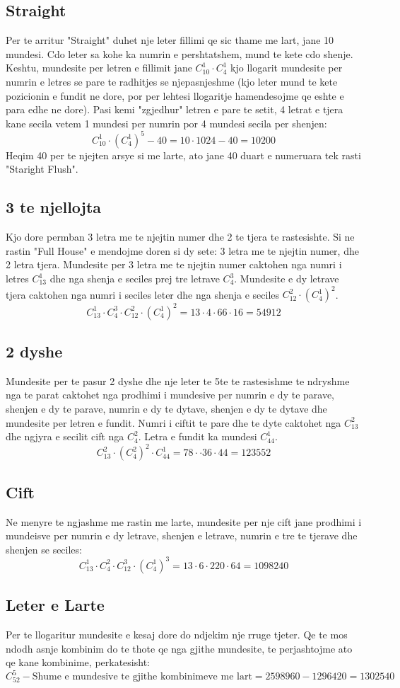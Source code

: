 \documentclass[a4paper]{article}
\begin{document}
\subsection*{Straight}
Per te arritur "Straight" duhet nje leter fillimi qe sic thame me lart, jane 10 mundesi. Cdo leter sa kohe ka numrin e pershtatshem, mund te kete cdo shenje. Keshtu, mundesite per letren e fillimit jane $C_{10}^{1}\cdot C_{4}^{1}$ kjo llogarit mundesite per numrin e letres se pare te radhitjes se njepasnjeshme (kjo leter mund te kete pozicionin e fundit ne dore, por per lehtesi llogaritje hamendesojme qe eshte e para edhe ne dore). Pasi kemi "zgjedhur" letren e pare te setit, 4 letrat e tjera kane secila vetem 1 mundesi per numrin por 4 mundesi secila per shenjen: \[
	C^{1}_{10} \cdot (C^{1}_{4})^{5}-40=10\cdot 1024-40=10200
\] 
Heqim 40 per te njejten arsye si me larte, ato jane 40 duart e numeruara tek rasti "Staright Flush".
\subsection*{3 te njellojta}
Kjo dore permban 3 letra me te njejtin numer dhe 2 te tjera te rastesishte. Si ne rastin "Full House" e mendojme doren si dy sete: 3 letra me te njejtin numer, dhe 2 letra tjera.
Mundesite per 3 letra me te njejtin numer caktohen nga numri i letres $C_{13}^{1}$ dhe nga shenja e seciles prej tre letrave $C_{4}^{3}$. Mundesite e dy letrave tjera caktohen nga numri i seciles leter dhe nga shenja e seciles $C_{12}^{2}\cdot (C_{4}^{1})^2$. \[
C_{13}^{1}\cdot C_{4}^{3}\cdot C_{12}^{2}\cdot (C_{4}^{1})^2=13\cdot 4\cdot 66 \cdot 16 =54912
\]
\subsection*{2 dyshe}
Mundesite per te pasur 2 dyshe dhe nje leter te 5te te rastesishme te ndryshme nga te parat caktohet nga prodhimi i mundesive per numrin e dy te parave, shenjen e dy te parave, numrin e dy te dytave, shenjen e dy te dytave dhe mundesite per letren e fundit. Numri i ciftit te pare dhe te dyte caktohet nga $C_{13}^{2}$ dhe ngjyra e secilit cift nga $C_{4}^{2}$. Letra e fundit ka mundesi $C_{44}^{1}$. \[
	C_{13}^{2}\cdot (C_{4}^{2})^{2}\cdot C_{44}^{1}=78\cdot \cdot 36\cdot 44=123552
\] 
\subsection*{Cift}
Ne menyre te ngjashme me rastin me larte, mundesite per nje cift jane prodhimi i mundeisve per numrin e dy letrave, shenjen e letrave, numrin e tre te tjerave dhe shenjen se seciles: \[
	C_{13}^{1}\cdot C_{4}^{2}\cdot C_{12}^{3}\cdot (C_{4}^{1})^{3}=13\cdot 6\cdot 220\cdot 64 =1098240
\] 
\subsection*{Leter e Larte}
Per te llogaritur mundesite e kesaj dore do ndjekim nje rruge tjeter. Qe te mos ndodh asnje kombinim do te thote qe nga gjithe mundesite, te perjashtojme ato qe kane kombinime, perkatesisht: \[
	C_{52}^{5} - \textrm{Shume e mundesive te gjithe kombinimeve me lart} =2598960-1296420=1302540
\] 
\end{document}
